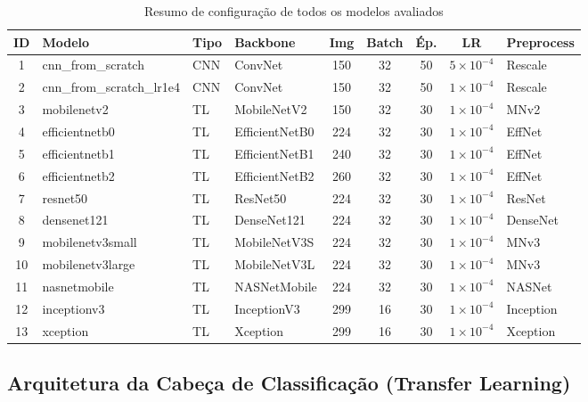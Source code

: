 \documentclass[12pt,a4paper]{article}
\begin{document}
\begin{table}[H]
\centering
\caption{Resumo de configuração de todos os modelos avaliados}
\small
\begin{tabular}{clllccccl}
\toprule
\textbf{ID} & \textbf{Modelo} & \textbf{Tipo} & \textbf{Backbone} &
\textbf{Img} & \textbf{Batch} & \textbf{Ép.} & \textbf{LR} & \textbf{Preprocess} \\
\midrule
1  & cnn\_from\_scratch      & CNN & ConvNet        & 150 & 32 & 50 & $5\times10^{-4}$ & Rescale  \\
2  & cnn\_from\_scratch\_lr1e4 & CNN & ConvNet      & 150 & 32 & 50 & $1\times10^{-4}$ & Rescale  \\
3  & mobilenetv2             & TL  & MobileNetV2    & 150 & 32 & 30 & $1\times10^{-4}$ & MNv2     \\
4  & efficientnetb0          & TL  & EfficientNetB0 & 224 & 32 & 30 & $1\times10^{-4}$ & EffNet   \\
5  & efficientnetb1          & TL  & EfficientNetB1 & 240 & 32 & 30 & $1\times10^{-4}$ & EffNet   \\
6  & efficientnetb2          & TL  & EfficientNetB2 & 260 & 32 & 30 & $1\times10^{-4}$ & EffNet   \\
7  & resnet50                & TL  & ResNet50       & 224 & 32 & 30 & $1\times10^{-4}$ & ResNet   \\
8  & densenet121             & TL  & DenseNet121    & 224 & 32 & 30 & $1\times10^{-4}$ & DenseNet \\
9  & mobilenetv3small        & TL  & MobileNetV3S   & 224 & 32 & 30 & $1\times10^{-4}$ & MNv3     \\
10 & mobilenetv3large        & TL  & MobileNetV3L   & 224 & 32 & 30 & $1\times10^{-4}$ & MNv3     \\
11 & nasnetmobile            & TL  & NASNetMobile   & 224 & 32 & 30 & $1\times10^{-4}$ & NASNet   \\
12 & inceptionv3             & TL  & InceptionV3    & 299 & 16 & 30 & $1\times10^{-4}$ & Inception\\
13 & xception                & TL  & Xception       & 299 & 16 & 30 & $1\times10^{-4}$ & Xception \\
\bottomrule
\end{tabular}
\end{table}

\subsection{Arquitetura da Cabeça de Classificação (Transfer Learning)}
\end{document}
